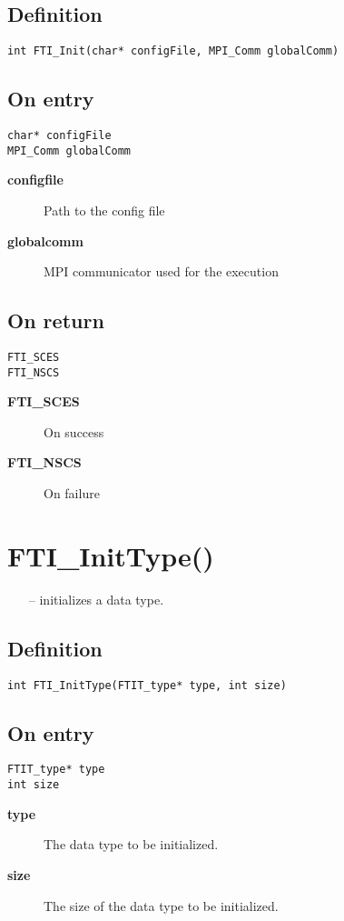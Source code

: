 \documentclass{refrep}
\begin{document}
\subsection*{Definition}
\begin{lstlisting}[frame=single]
int FTI_Init(char* configFile, MPI_Comm globalComm)
\end{lstlisting}
\subsection*{On entry}
\begin{lstlisting}[frame=single]
char* configFile
MPI_Comm globalComm
\end{lstlisting}
\begin{description}
\item[\textbf{configfile}] Path to the config file
\item[\textbf{globalcomm}] MPI communicator used for the execution
\end{description}
\subsection*{On return}
\begin{lstlisting}[frame=single]
FTI_SCES
FTI_NSCS
\end{lstlisting}
\begin{description}
\item[\textbf{FTI\_SCES}] On success
\item[\textbf{FTI\_NSCS}] On failure
\end{description}
\newpage
\section{\asciifamily FTI\_InitType()}\label{sec:ftisnapshot}
\begin{framed}
\begin{itemize}
\item[--] initializes a data type.
\end{itemize}
\end{framed}
\subsection*{Definition}
\begin{lstlisting}[frame=single]
int FTI_InitType(FTIT_type* type, int size)
\end{lstlisting}
\subsection*{On entry}
\begin{lstlisting}[frame=single]
FTIT_type* type
int size
\end{lstlisting}
\begin{description}
\item[\textbf{type}] The data type to be initialized.
\item[\textbf{size}] The size of the data type to be initialized.
\end{description}
\end{document}
